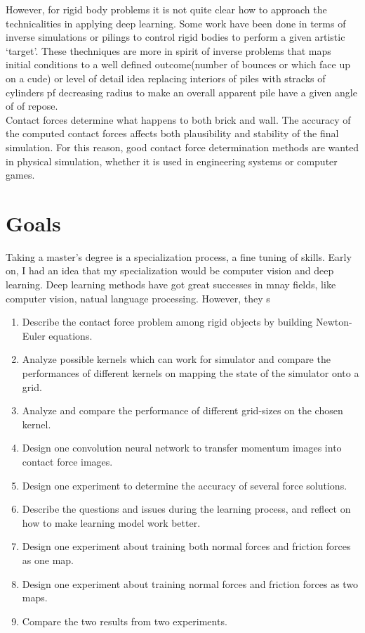     However, for rigid body problems it is not quite clear how to approach the technicalities in applying deep learning. Some work have been done in terms of inverse simulations or pilings to control rigid bodies to perform a given artistic `target'. These thechniques are more in spirit of inverse problems that maps initial conditions to a well defined outcome(number of bounces or which face up on a cude) or level of detail idea replacing interiors of piles with stracks of cylinders pf decreasing radius to make an overall apparent pile have a given angle of of repose. \\

    Contact forces determine what happens to both brick and wall. The accuracy of the computed contact forces affects both plausibility and stability of the final simulation. For this reason, good contact force determination methods are wanted in physical simulation, whether it is used in engineering systems or computer games.

\section{Goals}
    Taking a master’s degree is a specialization process, a fine tuning of skills. Early on, I had an idea that my specialization would be computer vision and deep learning. Deep learning methods have got great successes in mnay fields, like computer vision, natual language processing. However, they s

    \begin{enumerate}
        \item Describe the contact force problem among rigid objects by building Newton-Euler equations.
        \item Analyze possible kernels which can work for simulator and compare the performances of different kernels on mapping the state of the simulator onto a grid.
        \item Analyze and compare the performance of different grid-sizes on the chosen kernel. 
        \item Design one convolution neural network to transfer momentum images into contact force images.
        \item Design one experiment to determine the accuracy of several force solutions.
        \item Describe the questions and issues during the learning process, and reflect on how to make learning model work better.
        \item Design one experiment about training both normal forces and friction forces  as one map.
        \item Design one experiment about training normal forces and friction forces as two maps.
        \item Compare the two results from two experiments.
    \end{enumerate}


